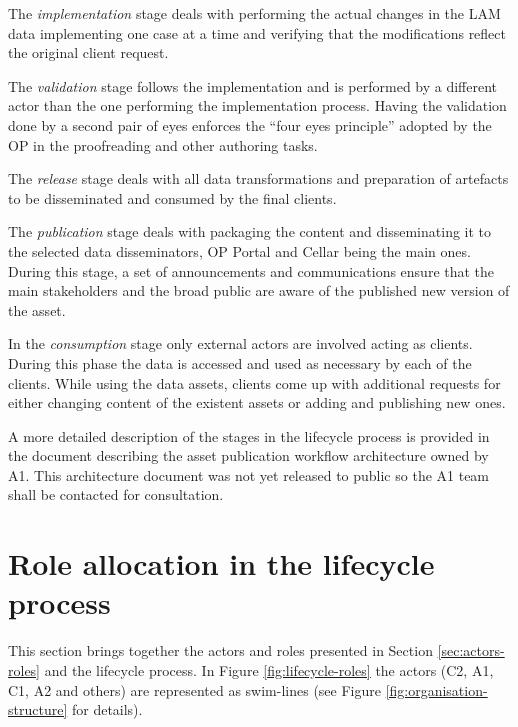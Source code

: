 	The \textit{implementation} stage deals with performing the actual changes in the LAM data implementing one case at a time and verifying that the modifications reflect the original client request.
	
	The \textit{validation} stage follows the implementation and is performed by a different actor than the one performing the implementation process. Having the validation done by a second pair of eyes enforces the ``four eyes principle'' adopted by the OP in the proofreading and other authoring tasks. 
	
	The \textit{release} stage deals with all data
transformations and preparation of artefacts to be disseminated and consumed by the final clients. 
		
	The \textit{publication} stage deals with packaging the content and disseminating it to the
selected data disseminators, OP Portal and Cellar being the main ones. During this stage, a
set of announcements and communications ensure that the main stakeholders and
the broad public are aware of the published new version of the asset.
	
	In the \textit{consumption} stage only external actors are involved acting as clients. During this phase the data is accessed and used as necessary by each of the clients. While using the data assets, clients come up with additional requests for either changing content
of the existent assets or adding and publishing new ones.
	
	A more detailed description of the stages in the lifecycle process is provided in the document describing the asset publication workflow architecture \citep{costetchi2020d} owned by A1. This architecture document was not yet released to public so the A1 team shall be contacted for consultation.
	
	\section{Role allocation in the lifecycle process}
	
	This section brings together the actors and roles presented in Section \ref{sec:actors-roles} and the lifecycle process. In Figure \ref{fig:lifecycle-roles} the actors (C2, A1, C1, A2 and others) are represented as swim-lines (see Figure \ref{fig:organisation-structure} for details). 
	
